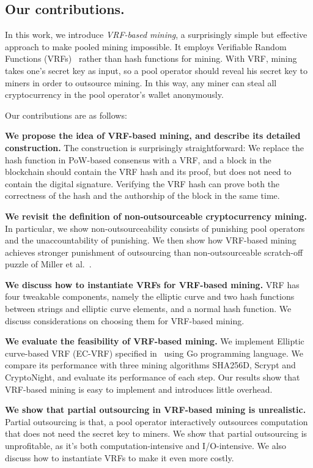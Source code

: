 \subsection{Our contributions.}
In this work, we introduce \textit{VRF-based mining}, a surprisingly simple but effective approach to make pooled mining impossible.
It employs Verifiable Random Functions (VRFs)~\cite{micali1999verifiable} rather than hash functions for mining.
With VRF, mining takes one's secret key as input, so a pool operator should reveal his secret key to miners in order to outsource mining.
In this way, any miner can steal all cryptocurrency in the pool operator's wallet anonymously.

Our contributions are as follows:

\textbf{We propose the idea of VRF-based mining, and describe its detailed construction.} The construction is surprisingly straightforward: We replace the hash function in PoW-based consensus with a VRF, and a block in the blockchain should contain the VRF hash and its proof, but does not need to contain the digital signature. Verifying the VRF hash can prove both the correctness of the hash and the authorship of the block in the same time.

\textbf{We revisit the definition of non-outsourceable cryptocurrency mining.} In particular, we show non-outsourceability consists of punishing pool operators and the unaccountability of punishing. We then show how VRF-based mining achieves stronger punishment of outsourcing than non-outsourceable scratch-off puzzle of Miller et al.~\cite{miller2015nonoutsourceable}.

\textbf{We discuss how to instantiate VRFs for VRF-based mining.} VRF has four tweakable components, namely the elliptic curve and two hash functions between strings and elliptic curve elements, and a normal hash function. We discuss considerations on choosing them for VRF-based mining.

\textbf{We evaluate the feasibility of VRF-based mining.} We implement Elliptic curve-based VRF (EC-VRF) specified in~\cite{goldberg2017draft} using Go programming language. We compare its performance with three mining algorithms SHA256D, Scrypt and CryptoNight, and evaluate its performance of each step. Our results show that VRF-based mining is easy to implement and introduces little overhead.

\textbf{We show that partial outsourcing in VRF-based mining is unrealistic.} Partial outsourcing is that, a pool operator interactively outsources computation that does not need the secret key to miners. We show that partial outsourcing is unprofitable, as it's both computation-intensive and I/O-intensive. We also discuss how to instantiate VRFs to make it even more costly.


